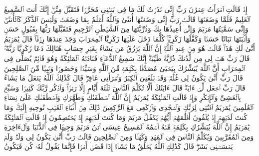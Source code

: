 \stopbuffer%
\startbuffer[\q:3:35]
إِذۡ قَالَتِ ٱمۡرَأَتُ عِمۡرَٰنَ رَبِّ إِنِّی نَذَرۡتُ لَكَ مَا فِی بَطۡنِی مُحَرَّرࣰا فَتَقَبَّلۡ مِنِّیۤۖ إِنَّكَ أَنتَ ٱلسَّمِیعُ ٱلۡعَلِیمُ%
\stopbuffer%
\startbuffer[\q:3:36]
فَلَمَّا وَضَعَتۡهَا قَالَتۡ رَبِّ إِنِّی وَضَعۡتُهَاۤ أُنثَىٰ وَٱللَّهُ أَعۡلَمُ بِمَا وَضَعَتۡ وَلَیۡسَ ٱلذَّكَرُ كَٱلۡأُنثَىٰۖ وَإِنِّی سَمَّیۡتُهَا مَرۡیَمَ وَإِنِّیۤ أُعِیذُهَا بِكَ وَذُرِّیَّتَهَا مِنَ ٱلشَّیۡطَٰنِ ٱلرَّجِیمِ%
\stopbuffer%
\startbuffer[\q:3:37]
فَتَقَبَّلَهَا رَبُّهَا بِقَبُولٍ حَسَنࣲ وَأَنۢبَتَهَا نَبَاتًا حَسَنࣰا وَكَفَّلَهَا زَكَرِیَّاۖ كُلَّمَا دَخَلَ عَلَیۡهَا زَكَرِیَّا ٱلۡمِحۡرَابَ وَجَدَ عِندَهَا رِزۡقࣰاۖ قَالَ یَٰمَرۡیَمُ أَنَّىٰ لَكِ هَٰذَاۖ قَالَتۡ هُوَ مِنۡ عِندِ ٱللَّهِۖ إِنَّ ٱللَّهَ یَرۡزُقُ مَن یَشَاۤءُ بِغَیۡرِ حِسَابٍ%
\stopbuffer%
\startbuffer[\q:3:38]
هُنَالِكَ دَعَا زَكَرِیَّا رَبَّهُۥۖ قَالَ رَبِّ هَبۡ لِی مِن لَّدُنكَ ذُرِّیَّةࣰ طَیِّبَةًۖ إِنَّكَ سَمِیعُ ٱلدُّعَاۤءِ%
\stopbuffer%
\startbuffer[\q:3:39]
فَنَادَتۡهُ ٱلۡمَلَٰۤئِكَةُ وَهُوَ قَاۤئِمࣱ یُصَلِّی فِی ٱلۡمِحۡرَابِ أَنَّ ٱللَّهَ یُبَشِّرُكَ بِیَحۡیَىٰ مُصَدِّقَۢا بِكَلِمَةࣲ مِّنَ ٱللَّهِ وَسَیِّدࣰا وَحَصُورࣰا وَنَبِیࣰّا مِّنَ ٱلصَّٰلِحِینَ%
\stopbuffer%
\startbuffer[\q:3:40]
قَالَ رَبِّ أَنَّىٰ یَكُونُ لِی غُلَٰمࣱ وَقَدۡ بَلَغَنِیَ ٱلۡكِبَرُ وَٱمۡرَأَتِی عَاقِرࣱۖ قَالَ كَذَٰلِكَ ٱللَّهُ یَفۡعَلُ مَا یَشَاۤءُ%
\stopbuffer%
\startbuffer[\q:3:41]
قَالَ رَبِّ ٱجۡعَل لِّیۤ ءَایَةࣰۖ قَالَ ءَایَتُكَ أَلَّا تُكَلِّمَ ٱلنَّاسَ ثَلَٰثَةَ أَیَّامٍ إِلَّا رَمۡزࣰاۗ وَٱذۡكُر رَّبَّكَ كَثِیرࣰا وَسَبِّحۡ بِٱلۡعَشِیِّ وَٱلۡإِبۡكَٰرِ%
\stopbuffer%
\startbuffer[\q:3:42]
وَإِذۡ قَالَتِ ٱلۡمَلَٰۤئِكَةُ یَٰمَرۡیَمُ إِنَّ ٱللَّهَ ٱصۡطَفَىٰكِ وَطَهَّرَكِ وَٱصۡطَفَىٰكِ عَلَىٰ نِسَاۤءِ ٱلۡعَٰلَمِینَ%
\stopbuffer%
\startbuffer[\q:3:43]
یَٰمَرۡیَمُ ٱقۡنُتِی لِرَبِّكِ وَٱسۡجُدِی وَٱرۡكَعِی مَعَ ٱلرَّٰكِعِینَ%
\stopbuffer%
\startbuffer[\q:3:44]
ذَٰلِكَ مِنۡ أَنۢبَاۤءِ ٱلۡغَیۡبِ نُوحِیهِ إِلَیۡكَۚ وَمَا كُنتَ لَدَیۡهِمۡ إِذۡ یُلۡقُونَ أَقۡلَٰمَهُمۡ أَیُّهُمۡ یَكۡفُلُ مَرۡیَمَ وَمَا كُنتَ لَدَیۡهِمۡ إِذۡ یَخۡتَصِمُونَ%
\stopbuffer%
\startbuffer[\q:3:45]
إِذۡ قَالَتِ ٱلۡمَلَٰۤئِكَةُ یَٰمَرۡیَمُ إِنَّ ٱللَّهَ یُبَشِّرُكِ بِكَلِمَةࣲ مِّنۡهُ ٱسۡمُهُ ٱلۡمَسِیحُ عِیسَى ٱبۡنُ مَرۡیَمَ وَجِیهࣰا فِی ٱلدُّنۡیَا وَٱلۡءَاخِرَةِ وَمِنَ ٱلۡمُقَرَّبِینَ%
\stopbuffer%
\startbuffer[\q:3:46]
وَیُكَلِّمُ ٱلنَّاسَ فِی ٱلۡمَهۡدِ وَكَهۡلࣰا وَمِنَ ٱلصَّٰلِحِینَ%
\stopbuffer%
\startbuffer[\q:3:47]
قَالَتۡ رَبِّ أَنَّىٰ یَكُونُ لِی وَلَدࣱ وَلَمۡ یَمۡسَسۡنِی بَشَرࣱۖ قَالَ كَذَٰلِكِ ٱللَّهُ یَخۡلُقُ مَا یَشَاۤءُۚ إِذَا قَضَىٰۤ أَمۡرࣰا فَإِنَّمَا یَقُولُ لَهُۥ كُن فَیَكُونُ%
\stopbuffer%
\startbuffer[\q:3:48]
